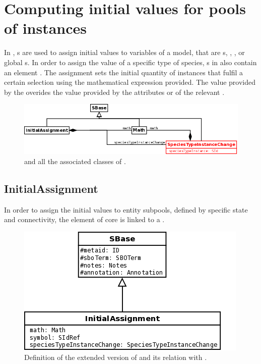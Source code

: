 \section{Computing initial values for pools of instances}

In \sbmlLthreeVone, s are used to assign initial values to variables of a model, that are s, , , or global s.  In order to assign the value of a specific type of species, s in \multiVone also contain an element . The assignment sets the initial quantity of instances that fulfil a certain selection using the mathematical expression provided. The value provided by the  overides the value provided by the attributes  or  of the relevant .

\begin{figure}[h!]
\begin{center}
\includegraphics[scale=0.3]{./figs/pngs/InitialAssignmentGeneral.png}
\caption{ and all the associated classes of \multiVone.}
\end{center}
\end{figure}


\subsection{InitialAssignment}

In order to assign the initial values to entity subpools, defined by specific state and connectivity, the element  of \sbmlLthreeVone core is linked to a .

\begin{figure}[H]
\begin{center}
\includegraphics[scale=0.4]{figs/pngs/InitialAssignmentClass.png} 
\caption{Definition of the extended version of  and its relation with .}
\label{fig:InitialAssignmentClass}
\end{center}
\end{figure}

